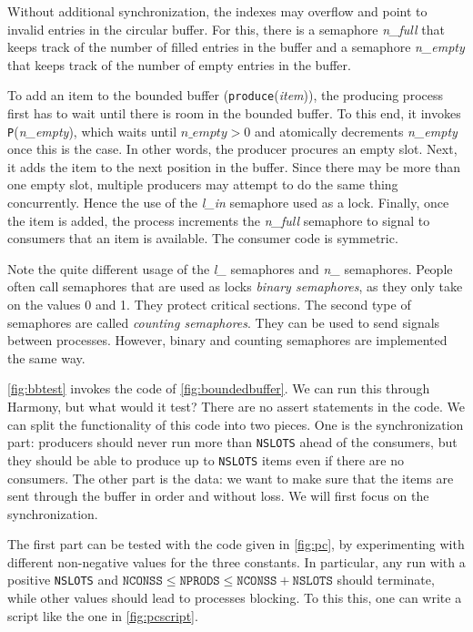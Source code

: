 \documentclass{report}
\begin{document}
Without additional synchronization, the indexes may overflow and point to invalid
entries in the circular buffer.
For this, there is a semaphore \textit{n\_full} that
keeps track of the number of filled entries in the buffer and a semaphore
\textit{n\_empty} that keeps track of the number of empty entries in the buffer.

To add an item to the bounded buffer (\texttt{produce}(\textit{item})), the producing
process first has to wait until there is room in the bounded buffer.
To this end, it invokes \texttt{P}(\textit{n\_empty}), which waits until
$\mathit{n\_empty} > 0$ and atomically decrements \textit{n\_empty} once this
is the case.  In other words, the producer procures an empty slot.
Next, it adds the item to the next position in the buffer.
Since there may be more than one empty slot, multiple producers may attempt
to do the same thing concurrently.  Hence the use of the \textit{l\_in}
semaphore used as a lock.  Finally, once the item is added, the process
increments the \textit{n\_full} semaphore to signal to consumers that
an item is available.
The consumer code is symmetric.

Note the quite different usage of the \textit{l\_} semaphores and \textit{n\_}
semaphores.
People often call semaphores that are used as locks \emph{binary semaphores},
%
as they only take on the values 0 and 1.
They protect critical sections.
The second type of semaphores are called \emph{counting semaphores}.
%
They can be used to send signals between processes.
However, binary and counting semaphores are implemented the same way.

\autoref{fig:bbtest} invokes the code of \autoref{fig:boundedbuffer}.
We can run this through Harmony, but what would it test?  There are no
assert statements in the code.
We can split the functionality of this code into two pieces.  One is
the synchronization part: producers should never run more than \texttt{NSLOTS}
ahead of the consumers, but they should be able to produce up to \texttt{NSLOTS}
items even if there are no consumers.  The other part is the data: we want
to make sure that the items are sent through the buffer in order and without
loss.  We will first focus on the synchronization.

The first part can be tested with the code given in \autoref{fig:pc}, by
experimenting with different non-negative values for the three constants.
In particular, any run with a positive \texttt{NSLOTS} and
$\mathtt{NCONSS} \le \mathtt{NPRODS} \le \mathtt{NCONSS} + \mathtt{NSLOTS}$
should terminate, while other values should lead to processes blocking.
To this this, one can write a script like the one in \autoref{fig:pcscript}.
\end{document}
